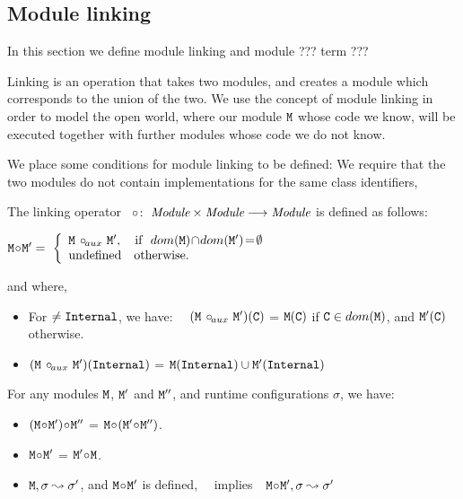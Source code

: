 \subsection{Module linking}

 In this section we define  module linking and module ??? term ???
 
 Linking is an operation that takes two modules, and creates a module which corresponds  to the union of the two. We use the concept of module linking in order to model the open world, where our module $\M$ whose code we know, will be executed together with further modules whose code we do not know. 

We place some conditions for module linking to be defined: We require that the two modules do not contain implementations for the same class identifiers,  

\begin{definition}

The linking operator\  \ $\link:\  \syntax{Module} \times  \syntax{Module} \longrightarrow \syntax{Module}$ is defined as follows:

$
\M \link \M{'}  =\ \left\{
\begin{array}{l}
                        \M\ \link\!_{aux}\ \M{'},\ \ \   \hbox{if}\  \ dom(\M)\!\cap\!dom(\M')\!=\!\emptyset\\
\mbox{undefined}  \ \ \ \mbox{otherwise.}
\end{array}
                    \right.$
                    
and where,                  
\begin{itemize}
     \item 
   For $\neq\prg{Internal}$, we have: \ \
   $(\M\ \link\!_{aux}\ \M')(\prg{C})$ = $\M(\prg{C})$  if  $\prg{C}\in dom(\M)$, and  $\M'(\prg{C})$ otherwise.
    \item  
   $(\M\ \link\!_{aux}\ \M')(\prg{Internal})$ = $ \M(\prg{Internal}) \cup  \M'(\prg{Internal})$
 \end{itemize}
\end{definition}

 
 \begin{lemma}
 For any modules $\M$,   $\M'$ and $\M''$, and runtime configurations $\sigma$, we have$:$
 \label{lemma:linking:properties}
 
 \begin{itemize}
     \item 
     $(\M \link \M')\link \M''$ = $\M \link (\M' \link \M'')$.
    \item  
      $\M \link \M'$  = $\M' \link\M$.
      \item
      $\M, \sigma \leadsto \sigma'$, and $\M\link \M'$ is defined, \  \  implies\ \   $\M\link \M', \sigma \leadsto \sigma'$
   \end{itemize}
 
 \end{lemma}
 

